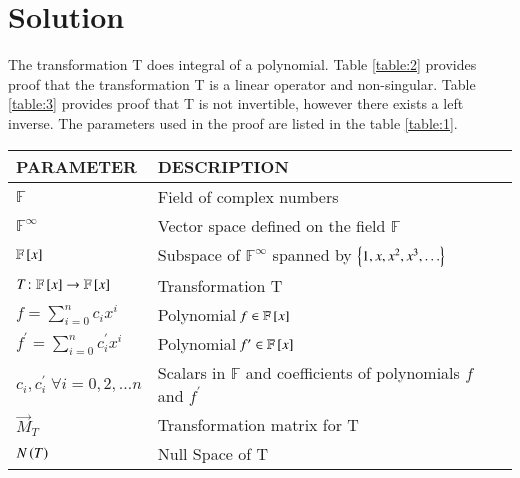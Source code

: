 \documentclass[journal,12pt,twocolumn]{IEEEtran}
\numberwithin{table}{section}
\begin{document}
\section{Solution}
The transformation T does integral of a polynomial. Table \ref{table:2} provides proof that the transformation T is a linear operator and non-singular. Table \ref{table:3} provides proof that T is not invertible, however there exists a left inverse. The parameters used in the proof are listed in the table \ref{table:1}.
\renewcommand{\thetable}{1}
\begin{table*}[ht!]
\begin{center}
\begin{tabular}{|l|l|}
\hline
\textbf{PARAMETER} & \textbf{DESCRIPTION}\\[0.5ex]
\hline
$\mathbb{F}$ & Field of complex numbers\\[0.5ex]
\hline
$\mathbb{F}^{\infty}$ & Vector space defined on the field $\mathbb{F}$\\[0.5ex]
\hline
$\mathbb{F}{}\left[x\right]$ & Subspace of $\mathbb{F}^{\infty}$ spanned by $\left\{1,x,x^2,x^3,\hdots\right\}$\\[0.5ex] 
\hline
$T\colon \mathbb{F}{}\left[x\right] \rightarrow \mathbb{F}{}\left[x\right]$ & Transformation T\\[0.5ex] 
\hline
$\mathit{f}=\sum \limits_{i=0}^n c_i x^i$ & Polynomial $\mathit{f} \in \mathbb{F}{}\left[x\right]$\\[0.5ex] 
\hline
$\mathit{f^\prime}=\sum \limits_{i=0}^n c^\prime_i x^i$ & Polynomial $\mathit{f^\prime} \in \mathbb{F}{}\left[x\right]$\\[0.5ex] 
\hline
$c_i,c^\prime_i \; \forall i=0,2,\hdots n$ & Scalars in $\mathbb{F}$ and coefficients of polynomials $\mathit{f}$ and $\mathit{f^\prime}$\\[0.5ex] 
\hline
$\vec{M}_T$ & Transformation matrix for T\\[0.5ex] 
\hline
$N\left(T\right)$ & Null Space of T\\[0.5ex] 
\hline
\end{tabular}
\caption{Parameters}
\label{table:1}
\end{center}
\vspace{-0.5cm}
\end{table*}
\end{document}
